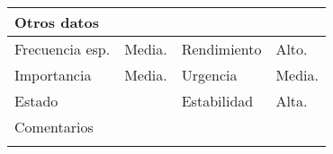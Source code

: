 \documentclass{article}
\begin{document}
\begin{table}[h]
\begin{tabular}{|l|l|l|l|l|l|}
\hline
\multicolumn{6}{|p{10cm}|}{Otros datos}\\
\hline
\multicolumn{1}{|p{2cm}|}{Frecuencia esp.} & \multicolumn{2}{p{3cm}}{Media.} & \multicolumn{1}{|p{2cm}|}{Rendimiento} & \multicolumn{2}{p{3cm}|}{Alto.}\\
\hline
\multicolumn{1}{|p{2cm}|}{Importancia} & \multicolumn{2}{p{3cm}}{Media.} & \multicolumn{1}{|p{2cm}|}{Urgencia} & \multicolumn{2}{p{3cm}|}{Media.}\\
\hline
\multicolumn{1}{|p{2cm}|}{Estado} & \multicolumn{2}{p{3cm}}{} & \multicolumn{1}{|p{2cm}|}{Estabilidad} & \multicolumn{2}{p{3cm}|}{Alta.}\\
\hline
\multicolumn{6}{|p{10cm}|}{Comentarios}\\
\hline
\multicolumn{6}{|p{10cm}|}{}\\
\hline
\end{tabular}
\end{table}
\end{document}
